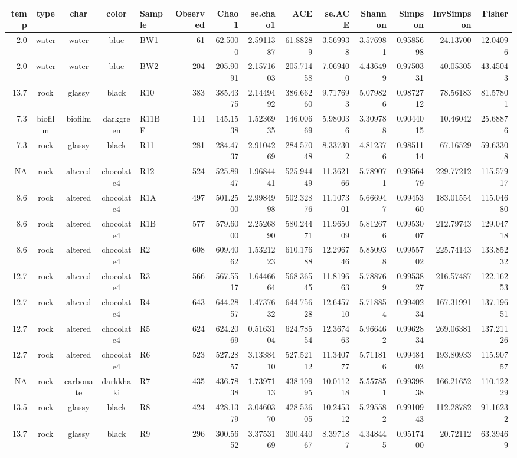 \documentclass[
]{book}
\begin{document}
\captionsetup[table]{labelformat=empty,skip=1pt}
\begin{longtable}{rccclrrrrrrrrr}
\toprule
temp & type & char & color & Sample & Observed & Chao1 & se.chao1 & ACE & se.ACE & Shannon & Simpson & InvSimpson & Fisher \\ 
\midrule
2.0 & water & water & blue & BW1 & 61 & 62.5000 & 2.5911387 & 61.88289 & 3.569938 & 3.576981 & 0.9585698 & 24.13700 & 12.04096 \\ 
2.0 & water & water & blue & BW2 & 204 & 205.9091 & 2.1571603 & 205.71458 & 7.069400 & 4.436499 & 0.9750331 & 40.05305 & 43.45043 \\ 
13.7 & rock & glassy & black & R10 & 383 & 385.4375 & 2.1449492 & 386.66260 & 9.717693 & 5.079826 & 0.9872712 & 78.56183 & 81.57801 \\ 
7.3 & biofilm & biofilm & darkgreen & R11BF & 144 & 145.1538 & 1.5236935 & 146.00669 & 5.980036 & 3.309788 & 0.9044015 & 10.46042 & 25.68876 \\ 
7.3 & rock & glassy & black & R11 & 281 & 284.4737 & 2.9104269 & 284.57048 & 8.337302 & 4.812376 & 0.9851114 & 67.16529 & 59.63308 \\ 
NA & rock & altered & chocolate4 & R12 & 524 & 525.8947 & 1.9684441 & 525.94449 & 11.362166 & 5.789071 & 0.9956479 & 229.77212 & 115.57917 \\ 
8.6 & rock & altered & chocolate4 & R1A & 497 & 501.2500 & 2.9984998 & 502.32876 & 11.107301 & 5.666947 & 0.9945360 & 183.01554 & 115.04680 \\ 
8.6 & rock & altered & chocolate4 & R1B & 577 & 579.6000 & 2.2526890 & 580.24471 & 11.965009 & 5.812676 & 0.9953007 & 212.79743 & 129.04718 \\ 
8.6 & rock & altered & chocolate4 & R2 & 608 & 609.4062 & 1.5321223 & 610.17688 & 12.296746 & 5.850938 & 0.9955702 & 225.74143 & 133.85232 \\ 
12.7 & rock & altered & chocolate4 & R3 & 566 & 567.5517 & 1.6446664 & 568.36545 & 11.819663 & 5.788769 & 0.9953827 & 216.57487 & 122.16253 \\ 
12.7 & rock & altered & chocolate4 & R4 & 643 & 644.2857 & 1.4737632 & 644.75628 & 12.645710 & 5.718854 & 0.9940234 & 167.31991 & 137.19651 \\ 
12.7 & rock & altered & chocolate4 & R5 & 624 & 624.2069 & 0.5163104 & 624.78554 & 12.367463 & 5.966462 & 0.9962834 & 269.06381 & 137.21126 \\ 
12.7 & rock & altered & chocolate4 & R6 & 523 & 527.2857 & 3.1338410 & 527.52112 & 11.340777 & 5.711816 & 0.9948403 & 193.80933 & 115.90757 \\ 
NA & rock & carbonate & darkkhaki & R7 & 435 & 436.7838 & 1.7397113 & 438.10995 & 10.011218 & 5.557851 & 0.9939838 & 166.21652 & 110.12229 \\ 
13.5 & rock & glassy & black & R8 & 424 & 428.1379 & 3.0460370 & 428.53605 & 10.245312 & 5.295582 & 0.9910943 & 112.28782 & 91.16232 \\ 
13.7 & rock & glassy & black & R9 & 296 & 300.5652 & 3.3753169 & 300.44067 & 8.397187 & 4.348445 & 0.9517400 & 20.72112 & 63.39469 \\ 
\bottomrule
\end{longtable}
\end{document}
